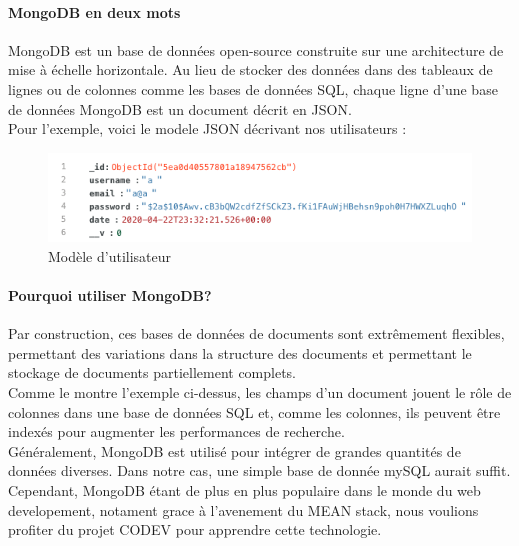 \documentclass[oneside,a4paper,13pt]{article}
\begin{document}
\paragraph{MongoDB en deux mots}
MongoDB est un base de données open-source construite sur une architecture de mise à échelle horizontale. Au lieu de stocker des données dans des tableaux de lignes ou de colonnes comme les bases de données SQL, chaque ligne d'une base de données MongoDB est un document décrit en JSON. \\ 
Pour l'exemple, voici le modele JSON décrivant nos utilisateurs : \\


\begin{figure}[H]
    \centering
        \includegraphics[width=0.8\linewidth]{Backend/Database/User json.png}
        \caption{Modèle d'utilisateur}
        \label{fig:my_label}
\end{figure}

\paragraph{Pourquoi utiliser MongoDB?}
Par construction, ces bases de données de documents sont extrêmement flexibles, permettant des variations dans la structure des documents et permettant le stockage de documents partiellement complets.\\
Comme le montre l'exemple ci-dessus, les champs d'un document jouent le rôle de colonnes dans une base de données SQL et, comme les colonnes, ils peuvent être indexés pour augmenter les performances de recherche.\\
Généralement, MongoDB est utilisé pour intégrer de grandes quantités de données diverses. Dans notre cas, une simple base de donnée mySQL aurait suffit. Cependant, MongoDB étant de plus en plus populaire dans le monde du web developement, notament grace à l'avenement du MEAN stack, nous voulions profiter du projet CODEV pour apprendre cette technologie.
\end{document}

